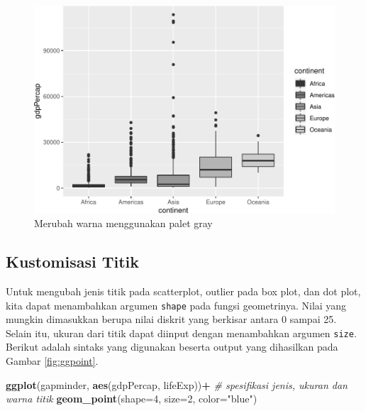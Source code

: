 \documentclass[]{book}
\newenvironment{Shaded}{\begin{snugshade}}{\end{snugshade}}
\newcommand{\KeywordTok}[1]{\textcolor[rgb]{0.13,0.29,0.53}{\textbf{#1}}}
\newcommand{\DataTypeTok}[1]{\textcolor[rgb]{0.13,0.29,0.53}{#1}}
\newcommand{\DecValTok}[1]{\textcolor[rgb]{0.00,0.00,0.81}{#1}}
\newcommand{\StringTok}[1]{\textcolor[rgb]{0.31,0.60,0.02}{#1}}
\newcommand{\CommentTok}[1]{\textcolor[rgb]{0.56,0.35,0.01}{\textit{#1}}}
\newcommand{\OperatorTok}[1]{\textcolor[rgb]{0.81,0.36,0.00}{\textbf{#1}}}
\newcommand{\NormalTok}[1]{#1}
\begin{document}
\begin{figure}

{\centering \includegraphics[width=0.7\linewidth]{EnvStat_files/figure-latex/ggcolor7-1} 

}

\caption{Merubah warna menggunakan palet gray}\label{fig:ggcolor7}
\end{figure}

\subsection{Kustomisasi Titik}\label{kustomisasi-titik}

Untuk mengubah jenis titik pada scatterplot, outlier pada box plot, dan
dot plot, kita dapat menambahkan argumen \texttt{shape} pada fungsi
geometrinya. Nilai yang mungkin dimasukkan berupa nilai diskrit yang
berkisar antara 0 sampai 25. Selain itu, ukuran dari titik dapat diinput
dengan menambahkan argumen \texttt{size}. Berikut adalah sintaks yang
digunakan beserta output yang dihasilkan pada Gambar \ref{fig:ggpoint}.

\begin{Shaded}
\begin{Highlighting}[]
\KeywordTok{ggplot}\NormalTok{(gapminder, }\KeywordTok{aes}\NormalTok{(gdpPercap, lifeExp))}\OperatorTok{+}
\StringTok{  }\CommentTok{# spesifikasi jenis, ukuran dan warna titik}
\StringTok{  }\KeywordTok{geom_point}\NormalTok{(}\DataTypeTok{shape=}\DecValTok{4}\NormalTok{, }\DataTypeTok{size=}\DecValTok{2}\NormalTok{, }\DataTypeTok{color=}\StringTok{"blue"}\NormalTok{)}
\end{Highlighting}
\end{Shaded}
\end{document}
